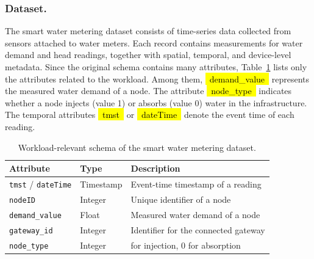 \documentclass[runningheads]{llncs}
\newcommand*{\codebox}[1]{{\ttfamily\hyphenchar\font=45\relax\hl{~#1~}}}
\begin{document}
\subsubsection{Dataset.}
The smart water metering dataset consists of time-series data collected from sensors attached to water meters.
Each record contains measurements for water demand and head readings, together with spatial, temporal, and device-level metadata.
Since the original schema contains many attributes, Table~\ref{tab:use-case-1-dataset-schema} lists only the attributes related to the workload.
Among them, \codebox{demand_value} represents the measured water demand of a node. 
The attribute \codebox{node_type} indicates whether a node injects (value 1) or absorbs (value 0) water in the infrastructure.
The temporal attributes \codebox{tmst} or \codebox{dateTime} denote the event time of each reading.
\begin{table}
  \caption{Workload-relevant schema of the smart water metering dataset.}
  \centering
  \footnotesize
  \setlength{\tabcolsep}{4pt}
  \renewcommand{\arraystretch}{1.15}
  \begin{tabularx}{\linewidth}{|>{\raggedright\arraybackslash}p{2.8cm}|
                               >{\raggedright\arraybackslash}p{1.8cm}|
                               >{\raggedright\arraybackslash}X|}
    \hline
    \textbf{Attribute} & \textbf{Type} & \textbf{Description} \\
    \hline
    \texttt{tmst} / \texttt{dateTime}
      & Timestamp
      & Event-time timestamp of a reading \\
    \hline
    \texttt{nodeID}
      & Integer
      & Unique identifier of a node \\
    \hline
    \texttt{demand\_value}
      & Float
      & Measured water demand of a node \\
    \hline
    \texttt{gateway\_id}
      & Integer
      & Identifier for the connected gateway \\
    \hline
    \texttt{node\_type}
      & Integer
      & 1 for injection, 0 for absorption \\
    \hline
  \end{tabularx}
  \label{tab:use-case-1-dataset-schema}
\end{table}

\end{document}
